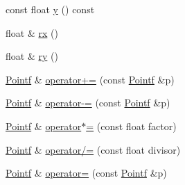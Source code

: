 \begin{DoxyCompactItemize}
const float \hyperlink{classprism_1_1_pointf_a2fedfacbfdce3fc0a305bb0ed2529f62}{y} () const 
\item 
float \& \hyperlink{classprism_1_1_pointf_ac99d0439f2bdfc7474373fed28929401}{rx} ()
\item 
float \& \hyperlink{classprism_1_1_pointf_a62e830d342930885456f2f0c291cced9}{ry} ()
\item 
\hyperlink{classprism_1_1_pointf}{Pointf} \& \hyperlink{classprism_1_1_pointf_a1154339d70d5b95d99b300e8bc81fdc5}{operator+=} (const \hyperlink{classprism_1_1_pointf}{Pointf} \&p)
\item 
\hyperlink{classprism_1_1_pointf}{Pointf} \& \hyperlink{classprism_1_1_pointf_abcfcc566fe5c72294969638569d132f5}{operator-\/=} (const \hyperlink{classprism_1_1_pointf}{Pointf} \&p)
\item 
\hyperlink{classprism_1_1_pointf}{Pointf} \& \hyperlink{classprism_1_1_pointf_a6b8c9fd10c8738613f625b1071ad0bee}{operator$\ast$=} (const float factor)
\item 
\hyperlink{classprism_1_1_pointf}{Pointf} \& \hyperlink{classprism_1_1_pointf_a1fd91431350c5b5baa69122d7a3431f0}{operator/=} (const float divisor)
\item 
\hyperlink{classprism_1_1_pointf}{Pointf} \& \hyperlink{classprism_1_1_pointf_a8cef81e23472ad029d97e7365b5e2ebc}{operator=} (const \hyperlink{classprism_1_1_pointf}{Pointf} \&p)
\end{DoxyCompactItemize}
